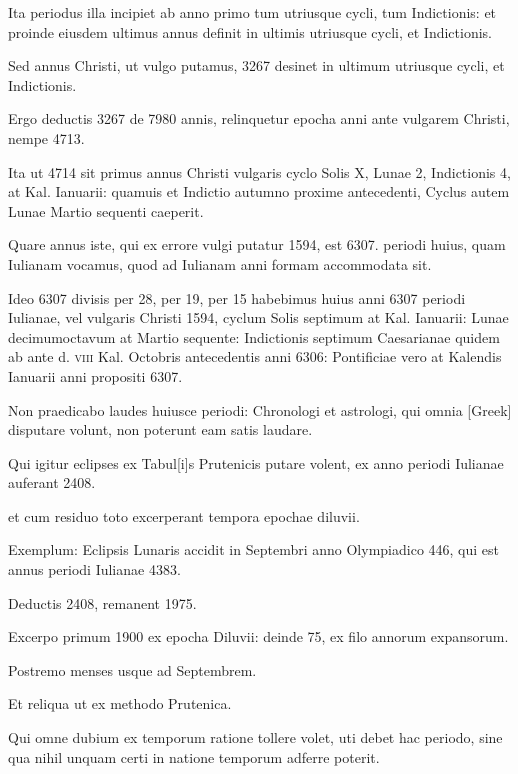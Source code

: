 Ita periodus illa incipiet ab anno primo tum utriusque cycli,
tum Indictionis: et proinde eiusdem ultimus annus definit in ultimis
utriusque cycli, et Indictionis.

Sed annus Christi, ut vulgo putamus,
3267 desinet in ultimum utriusque cycli, et Indictionis.

Ergo deductis
3267 de 7980 annis, relinquetur epocha anni ante vulgarem
Christi, nempe 4713.

Ita ut 4714 sit primus annus Christi vulgaris cyclo
Solis \textsc{X}, Lunae 2, Indictionis 4, at Kal. Ianuarii: quamuis et Indictio
autumno proxime antecedenti, Cyclus autem Lunae Martio sequenti
caeperit.

Quare annus iste, qui ex errore vulgi putatur 1594, est 6307.
periodi huius, quam Iulianam vocamus, quod ad Iulianam anni formam
accommodata sit.

Ideo 6307 divisis per 28, per 19, per 15 habebimus
huius anni 6307 periodi Iulianae, vel vulgaris Christi 1594, cyclum
Solis septimum at Kal. Ianuarii: Lunae decimumoctavum at
Martio sequente: Indictionis septimum Caesarianae quidem ab ante d.
\textsc{viii} Kal. Octobris antecedentis anni 6306: Pontificiae vero at
Kalendis Ianuarii anni propositi 6307.

Non praedicabo laudes huiusce periodi:
Chronologi et astrologi, qui omnia \textgreek{[Greek]} disputare volunt,
non poterunt eam satis laudare.

Qui igitur eclipses ex Tabul[i]s
Prutenicis putare volent, ex anno periodi Iulianae auferant 2408.

et
cum residuo toto excerperant tempora epochae diluvii.

Exemplum: Eclipsis
Lunaris accidit in Septembri anno Olympiadico 446, qui est annus
periodi Iulianae 4383.

Deductis 2408, remanent 1975.

Excerpo
primum 1900 ex epocha Diluvii: deinde 75, ex filo annorum expansorum.

Postremo menses usque ad Septembrem.

Et reliqua ut ex methodo
Prutenica.

Qui omne dubium ex temporum ratione tollere
volet, uti debet hac periodo, sine qua nihil unquam certi in natione
temporum adferre poterit.
